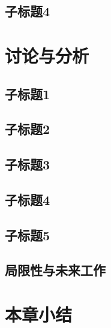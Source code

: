\subsection{子标题4}

\section{讨论与分析}

\subsection{子标题1}

\subsection{子标题2}

\subsection{子标题3}

\subsection{子标题4}

\subsection{子标题5}

\subsection{局限性与未来工作}

\section{本章小结}